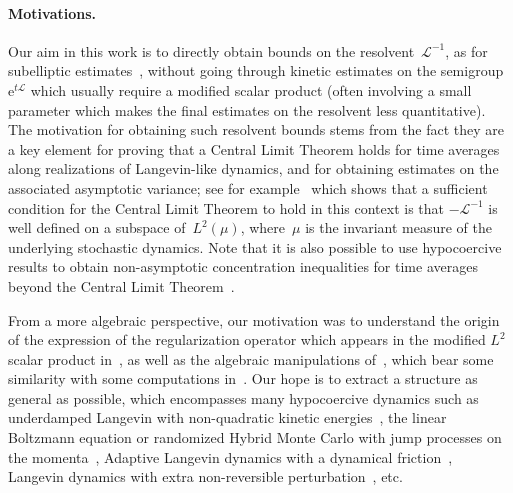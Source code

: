 \documentclass{article}
\newcommand{\rme}{\mathrm{e}}
\newcommand{\cL}{\mathcal{L}}
\begin{document}
\paragraph{Motivations.}
Our aim in this work is to directly obtain bounds on the resolvent~$\cL^{-1}$, as for subelliptic estimates~\cite{EH03,HN04,HN05}, without going through kinetic estimates on the semigroup $\rme^{t \cL}$ which usually require a modified scalar product (often involving a small parameter which makes the final estimates on the resolvent less quantitative). The motivation for obtaining such resolvent bounds stems from the fact they are a key element for proving that a Central Limit Theorem holds for time averages along realizations of Langevin-like dynamics, and for obtaining estimates on the associated asymptotic variance; see for example~\cite{Bhattacharya} which shows that a sufficient condition for the Central Limit Theorem to hold in this context is that $-\cL^{-1}$ is well defined on a subspace of~$L^2(\mu)$, where~$\mu$ is the invariant measure of the underlying stochastic dynamics. Note that it is also possible to use hypocoercive results to obtain non-asymptotic concentration inequalities for time averages beyond the Central Limit Theorem~\cite{BRB19,Mon19b}.

From a more algebraic perspective, our motivation was to understand the origin of the expression of the regularization operator which appears in the modified $L^2$ scalar product in~\cite{Herau06,DMS09,DMS15}, as well as the algebraic manipulations of~\cite{AM19,CLW19}, which bear some similarity with some computations in~\cite{Herau06,DMS09,DMS15}. Our hope is to extract a structure as general as possible, which encompasses many hypocoercive dynamics such as underdamped Langevin with non-quadratic kinetic energies~\cite{ST18}, the linear Boltzmann equation or randomized Hybrid Monte Carlo with jump processes on the momenta~\cite{BRSS17}, Adaptive Langevin dynamics with a dynamical friction~\cite{Herzog18,LSS19}, Langevin dynamics with extra non-reversible perturbation~\cite{DNS17}, etc.
\end{document}
